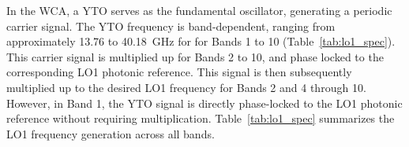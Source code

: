In the \ac{WCA}, a \ac{YTO} serves as the fundamental oscillator, generating a periodic carrier signal. 
The \ac{YTO} frequency is band-dependent, ranging from approximately 13.76 to 40.18~GHz for for Bands 1 to 10 (Table~\ref{tab:lo1_spec}).
This carrier signal is multiplied up for Bands 2 to 10, and phase locked to the corresponding \ac{LO1} photonic reference. 
This signal is then subsequently multiplied up to the desired \ac{LO1} frequency for Bands 2 and 4 through 10.
However, in Band 1, the \ac{YTO} signal is directly phase-locked to the \ac{LO1} photonic reference without requiring multiplication. Table~\ref{tab:lo1_spec} summarizes the \ac{LO1} frequency generation across all bands.

